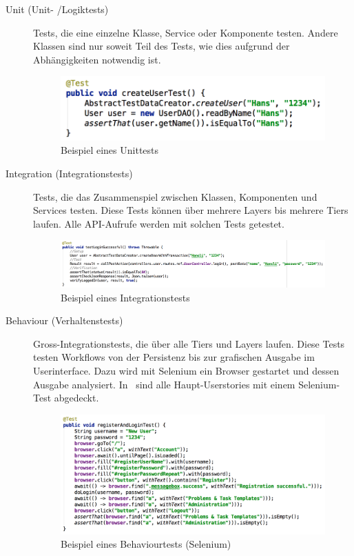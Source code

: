 			\begin{description}
				\item[Unit (Unit- /Logiktests)] Tests, die eine einzelne Klasse, 
					Service oder Komponente testen. 
					Andere Klassen sind nur soweit Teil des Tests, 
					wie dies aufgrund der Abhängigkeiten notwendig ist.
					\begin{figure}[H]
						\includegraphics[scale=0.5]{projectPlan/media/img/unitTest.png}
						\centering
						\caption{Beispiel eines Unittests}
						\label{fig:exampleUnittest}
					\end{figure}

				\item[Integration (Integrationstests)] Tests, die das Zusammenspiel zwischen Klassen, 
					Komponenten und Services testen. 
					Diese Tests können über mehrere Layers bis mehrere Tiers laufen.
					Alle API-Aufrufe werden mit solchen Tests getestet.
					\begin{figure}[H]
						\includegraphics[scale=0.5]{projectPlan/media/img/integrationTest.png}
						\centering
						\caption{Beispiel eines Integrationstests}
						\label{fig:exampleIntegrationtest}
					\end{figure}

				\item[Behaviour (Verhaltenstests)] Gross-Integrationstests, 
					die über alle Tiers und Layers laufen. 
					Diese Tests testen Workflows von der Persistenz 
					bis zur grafischen Ausgabe im Userinterface. 
					Dazu wird mit Selenium ein Browser gestartet und dessen Ausgabe analysiert.
					In \eeppi\ sind alle Haupt-Userstories mit einem Selenium-Test abgedeckt.
					
					\begin{figure}[H]
						\includegraphics[scale=0.5]{projectPlan/media/img/behaviourTest.png}
						\centering
						\caption{Beispiel eines Behaviourtests (Selenium)}
						\label{fig:exampleBehaviourtest}
					\end{figure}


\end{description}
